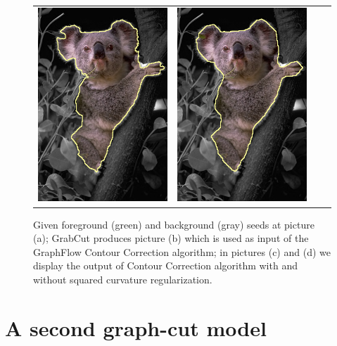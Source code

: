 \begin{figure}
\begin{tabular}{cccc}
 	\includegraphics[scale=0.25]{figures/chapter8/segmentation/coala/k-0.0/corrected-seg.png} &  	
 	\includegraphics[scale=0.25]{figures/chapter8/segmentation/coala/k-1.0/corrected-seg.png}
\end{tabular}	
\caption{Given foreground (green) and background (gray) seeds at picture (a); GrabCut produces picture (b) which is used as input of the GraphFlow Contour Correction algorithm; in pictures (c) and (d) we display the output of Contour Correction algorithm with and without squared curvature regularization. }
\label{fig:ch8-segmentation}
\end{figure}


\section{A second graph-cut model}

